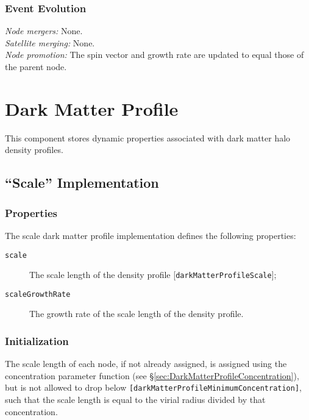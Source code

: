 \subsubsection{Event Evolution}

\noindent\emph{Node mergers:} None.\\

\noindent\emph{Satellite merging:} None.\\

\noindent\emph{Node promotion:} The spin vector and growth rate are updated to equal those of the parent node.\\

\section{Dark Matter Profile}\label{sec:DarkMatterProfileComponent}

This \gls{component} stores dynamic properties associated with dark matter halo density profiles.

\subsection{``Scale'' Implementation}\label{sec:DarkMatterProfileScale}

\subsubsection{Properties}

The scale dark matter profile implementation defines the following properties:
\begin{description}
 \item [{\tt scale}] The scale length of the density profile [{\tt darkMatterProfileScale}];
 \item [{\tt scaleGrowthRate}] The growth rate of the scale length of the density profile.
\end{description}

\subsubsection{Initialization}

The scale length of each node, if not already assigned, is assigned using the concentration parameter function (see \S\ref{sec:DarkMatterProfileConcentration}), but is not allowed to drop below {\tt [darkMatterProfileMinimumConcentration]}, such that the scale length is equal to the virial radius divided by that concentration.

